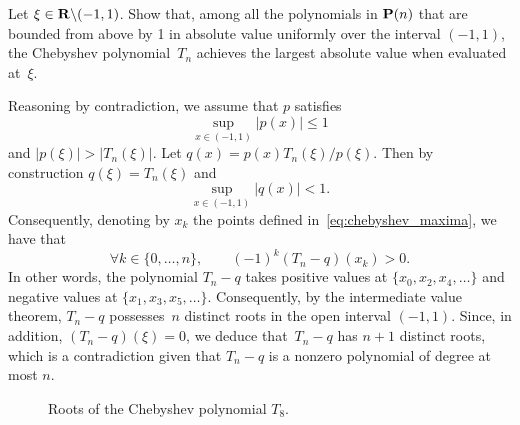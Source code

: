 \begin{exercise}
    \label{exercise:auxiliary_chebyshev}
    Let $\xi \in \mathbf R \backslash (-1, 1)$.
    Show that, among all the polynomials in $\mathbf P(n)$ that are bounded from above by 1 in absolute value uniformly over the interval $(-1, 1)$,
    the Chebyshev polynomial~$T_n$ achieves the largest absolute value when evaluated at~$\xi$.
\end{exercise}
\begin{solution}
    Reasoning by contradiction,
    we assume that $p$ satisfies
    \[
        \sup_{x \in (-1, 1)} \lvert p(x) \rvert \leq 1
    \]
    and $\lvert p(\xi) \rvert > \lvert T_n(\xi) \rvert$.
    Let $q(x) = p(x) T_n(\xi) / p(\xi)$.
    Then by construction $q(\xi) = T_n(\xi)$
    and
    \[
       \sup_{x \in (-1, 1)} \lvert q(x) \rvert < 1.
    \]
    Consequently, denoting by $x_k$ the points defined in~\eqref{eq:chebyshev_maxima},
    we have that
    \[
        \forall k \in \{0, \dotsc, n\}, \qquad
        (-1)^k (T_n - q)(x_k) > 0.
    \]
    In other words, the polynomial $T_n - q$ takes positive values at $\{x_0, x_2, x_4, \dotsc\}$ and negative values at $\{x_1, x_3, x_5, \dotsc\}$.
    Consequently, by the intermediate value theorem,
    $T_n - q$ possesses~$n$ distinct roots in the open interval $(-1, 1)$.
    Since, in addition, $(T_n - q)(\xi) = 0$,
    we deduce that~$T_n - q$ has $n+1$ distinct roots,
    which is a contradiction given that $T_n - q$ is a nonzero polynomial of degree at most $n$.
\end{solution}

\begin{figure}
    \centering
    \caption{Roots of the Chebyshev polynomial $T_8$.}
    \label{fig:chebyshev_roots}
\end{figure}

